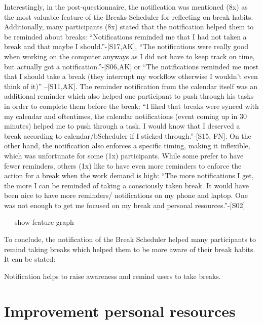 \documentclass{hasel_thesis}
\begin{document}
Interestingly, in the post-questionnaire, the notification was mentioned (8x) as the most valuable feature of the Breaks Scheduler for reflecting on break habits. Additionally, many participants (8x) stated that the notification helped them to be reminded about breaks: “Notifications reminded me that I had not taken a break and that maybe I should.”-[S17,AK], “The notifications were really good when working on the computer anyways as I did not have to keep track on time, but actually got a notification.”-[S06,AK] or “The notifications reminded me most that I should take a break (they interrupt my workflow otherwise I wouldn't even think of it)” –[S11,AK]. The reminder notification from the calendar itself was an additional reminder which also helped one participant to push through his tasks in order to complete them before the break: “I liked that breaks were synced with my calendar and oftentimes, the calendar notifications (event coming up in 30 minutes) helped me to push through a task. I would know that I deserved a break according to calendar/bScheduler if I sticked through.”-[S15, FN]. On the other hand, the notification also enforces a specific timing, making it inflexible, which was unfortunate for some (1x) participants. While some prefer to have fewer reminders, others (1x) like to have even more reminders to enforce the action for a break when the work demand is high: “The more notifications I get, the more I can be reminded of taking a consciously taken break. It would have been nice to have more reminders/ notifications on my phone and laptop. One was not enough to get me focused on my break and personal resources.”-[S02]

-----show feature graph-----------


To conclude, the notification of the Break Scheduler helped many participants to remind taking breaks which helped them to be more aware of their break habits. It can be stated:

\begin{tcolorbox}[colback=white!5!white,colframe=black!75!black]
  Notification helps to raise awareness and remind users to take breaks.
\end{tcolorbox}




\section{Improvement personal resources} \label{resources}

\end{document}
